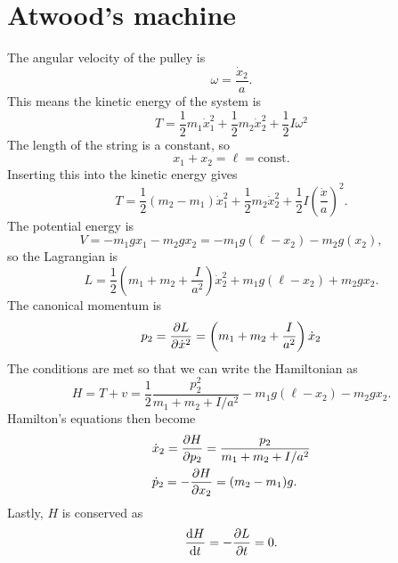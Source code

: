 \documentclass{article}
\begin{document}
    \section{Atwood's machine}
        The angular velocity of the pulley is 
        \begin{equation*}
            \omega = \frac{\dot x_2}{a}.
        \end{equation*}
        This means the kinetic energy of the system is 
        \begin{equation*}
            T = \frac{1}{2}m_1\dot x_1^2+\frac{1}{2}m_2\dot x_2^2 + \frac{1}{2}I \omega^2
        \end{equation*}
        The length of the string is a constant, so 
        \begin{equation*}
            x_1 + x_2 = \ell = \mathrm{const.}
        \end{equation*}
        Inserting this into the kinetic energy gives 
        \begin{equation*}
            T = \frac{1}{2}(m_2-m_1)\dot x_1^2+\frac{1}{2}m_2\dot x_2^2 + \frac{1}{2}I \left(\frac{\dot x}{a}\right)^2.
        \end{equation*}
        The potential energy is
        \begin{equation*}
            V = - m_1 g x_1 - m_2 g x_2 = -m_1g(\ell -x_2) - m_2g(x_2),
        \end{equation*}
        so the Lagrangian is
        \begin{equation*}
            L = \frac{1}{2}\left(m_1 + m_2 + \frac{I}{a^2}\right) \dot x_2^2 + m_1g(\ell - x_2) + m_2 g x_2.
        \end{equation*}
        The canonical momentum is
        \begin{equation*}
            p_{2} = \pdv{L}{\dot x^2} = \left(m_1 + m_2 + \frac{I}{a^2}\right) \dot x_ 2
        \end{equation*}
        The conditions are met so that we can write the Hamiltonian as
        \begin{equation*}
            H = T + v = \frac{1}{2}\frac{p_2^2}{m_1 + m_2 + I/a^2} -m_1g(\ell - x_2) - m_2 g x_2.
        \end{equation*}
        Hamilton's equations then become
        \begin{align*}
            & \dot x_2 = \pdv{H}{p_2} = \frac{p_2}{m_1 + m_2 + I/a^2} \\
            & \dot p_2 = - \pdv{H}{x_2} = (m_2 - m_1)g.
        \end{align*}
        Lastly, $H$ is conserved as
        \begin{equation*}
            \dv{H}{t} = -\pdv{L}{t} = 0.
        \end{equation*}
\end{document}
